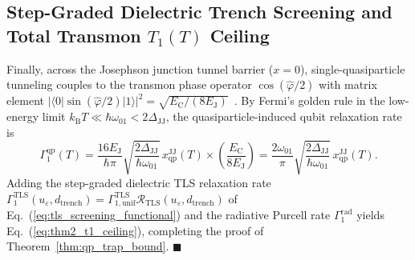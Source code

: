 \documentclass[11pt,letterpaper]{article}
\theoremstyle{definition}
\begin{document}
\subsection{Step-Graded Dielectric Trench Screening and Total Transmon $T_1(T)$ Ceiling}

Finally, across the Josephson junction tunnel barrier ($x = 0$), single-quasiparticle tunneling couples to the transmon phase operator $\cos(\hat{\varphi}/2)$ with matrix element $|\langle 0 | \sin(\hat{\varphi}/2) | 1 \rangle|^2 = \sqrt{E_{\mathrm{C}} / (8E_{\mathrm{J}})}$~\cite{Catelani2011}. By Fermi's golden rule in the low-energy limit $k_{\mathrm{B}} T \ll \hbar\omega_{01} < 2\Delta_{\mathrm{JJ}}$, the quasiparticle-induced qubit relaxation rate is
\begin{equation}
  \Gamma_1^{\mathrm{qp}}(T) = \frac{16 E_{\mathrm{J}}}{\hbar \pi} \sqrt{\frac{2\Delta_{\mathrm{JJ}}}{\hbar\omega_{01}}} \, x_{\mathrm{qp}}^{\mathrm{JJ}}(T) \times \left(\frac{E_{\mathrm{C}}}{8 E_{\mathrm{J}}}\right) = \frac{2\omega_{01}}{\pi} \sqrt{\frac{2\Delta_{\mathrm{JJ}}}{\hbar\omega_{01}}} \, x_{\mathrm{qp}}^{\mathrm{JJ}}(T).
  \label{eq:appC_gamma_qp}
\end{equation}
Adding the step-graded dielectric TLS relaxation rate $\Gamma_1^{\mathrm{TLS}}(u_\varepsilon, d_{\mathrm{trench}}) = \Gamma_{1,\mathrm{unif}}^{\mathrm{TLS}} \mathcal{R}_{\mathrm{TLS}}(u_\varepsilon, d_{\mathrm{trench}})$ of Eq.~(\ref{eq:tls_screening_functional}) and the radiative Purcell rate $\Gamma_1^{\mathrm{rad}}$ yields Eq.~(\ref{eq:thm2_t1_ceiling}), completing the proof of Theorem~\ref{thm:qp_trap_bound}. $\blacksquare$
\end{document}
